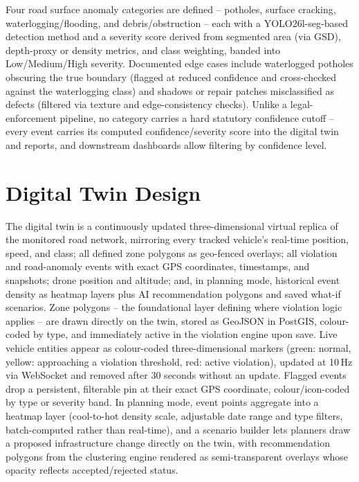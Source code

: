 \documentclass[conference]{IEEEtran}
\begin{document}
Four road surface anomaly categories are defined -- potholes, surface cracking, waterlogging/flooding, and debris/obstruction -- each with a YOLO26l-seg-based detection method and a severity score derived from segmented area (via GSD), depth-proxy or density metrics, and class weighting, banded into Low/Medium/High severity. Documented edge cases include waterlogged potholes obscuring the true boundary (flagged at reduced confidence and cross-checked against the waterlogging class) and shadows or repair patches misclassified as defects (filtered via texture and edge-consistency checks). Unlike a legal-enforcement pipeline, no category carries a hard statutory confidence cutoff -- every event carries its computed confidence/severity score into the digital twin and reports, and downstream dashboards allow filtering by confidence level.

\section{Digital Twin Design}
\label{sec:twin}

The digital twin is a continuously updated three-dimensional virtual replica of the monitored road network, mirroring every tracked vehicle's real-time position, speed, and class; all defined zone polygons as geo-fenced overlays; all violation and road-anomaly events with exact GPS coordinates, timestamps, and snapshots; drone position and altitude; and, in planning mode, historical event density as heatmap layers plus AI recommendation polygons and saved what-if scenarios. Zone polygons -- the foundational layer defining where violation logic applies -- are drawn directly on the twin, stored as GeoJSON in PostGIS, colour-coded by type, and immediately active in the violation engine upon save. Live vehicle entities appear as colour-coded three-dimensional markers (green: normal, yellow: approaching a violation threshold, red: active violation), updated at 10\,Hz via WebSocket and removed after 30 seconds without an update. Flagged events drop a persistent, filterable pin at their exact GPS coordinate, colour/icon-coded by type or severity band. In planning mode, event points aggregate into a heatmap layer (cool-to-hot density scale, adjustable date range and type filters, batch-computed rather than real-time), and a scenario builder lets planners draw a proposed infrastructure change directly on the twin, with recommendation polygons from the clustering engine rendered as semi-transparent overlays whose opacity reflects accepted/rejected status.
\end{document}
